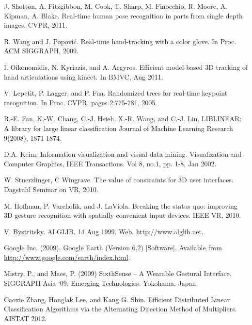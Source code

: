 \documentclass[letterpaper,twocolumn,10pt]{article}
\newcommand{\cutsection}{\vspace*{-0.20in}}%
\begin{document}
\cutsection

\cutsection

\cutsection

\cutsection

\cutsection

\cutsection

\cutsection

\cutsection

\cutsection

\cutsection

\begin{thebibliography}{9}
\cutsection
{} J. Shotton, A. Fitzgibbon, M. Cook, T. Sharp, M. Finocchio, R. Moore, A. Kipman, A. Blake. Real-time human pose recognition in parts from single depth images. CVPR, 2011.

 R. Wang and J. Popovi\'c. Real-time hand-tracking with a color glove. In Proc. ACM SIGGRAPH, 2009.

 I. Oikonomidis, N. Kyriazis, and A. Argyros. Efficient model-based 3D tracking of hand articulations using kinect. In BMVC, Aug 2011.

 V. Lepetit, P. Lagger, and P. Fua. Randomized trees for real-time keypoint recognition. In Proc. CVPR, pages 2:775-781, 2005. 

 R.-E. Fan, K.-W. Chang, C.-J. Hsieh, X.-R. Wang, and C.-J. Lin. LIBLINEAR: A library for large linear classification Journal of Machine Learning Research 9(2008), 1871-1874.

 D.A. Keim. Information visualization and visual data mining. Visualization and Computer Graphics, IEEE Transactions. Vol 8, no.1, pp. 1-8, Jan 2002.

 W. Stuerzlinger, C Wingrave. The value of constraints for 3D user interfaces. Dagstuhl Seminar on VR, 2010.

 M. Hoffman, P. Varcholik, and J. LaViola. Breaking the status quo: improving 3D gesture recognition with spatially convenient input devices. IEEE VR, 2010.

 V. Bystritsky. ALGLIB. 14 Aug 1999. Web. \url{http://www.alglib.net}.

 Google Inc. (2009). Google Earth (Version 6.2) [Software]. Available from \url{http://www.google.com/earth/index.html}.

 Mistry, P., and Maes, P. (2009) SixthSense – A Wearable Gestural Interface. SIGGRAPH Asia ‘09, Emerging Technologies. Yokohama, Japan

 Caoxie Zhang, Honglak Lee, and Kang G. Shin.  Efficient Distributed Linear Classification Algorithms via the Alternating Direction Method of Multipliers. AISTAT 2012.

\end{thebibliography}
\end{document}
